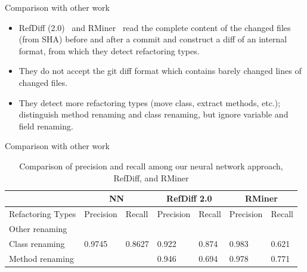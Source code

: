 \documentclass[xcolor=svgnames]{beamer}
\begin{document}
\begin{frame}{Comparison with other work}
\begin{itemize}
\item RefDiff (2.0)~\cite{silva2020refdiff} and RMiner~\cite{tsantalis2018accurate} read the complete content of the changed files (from SHA) before and after a commit and construct a diff of an internal format, from which they detect refactoring types.
\item They do not accept the git diff format which contains barely changed lines of changed files.
\item They detect more refactoring types (move class, extract methods, etc.); distinguish method renaming and class renaming, but ignore variable and field renaming.

\end{itemize}


\end{frame}

\begin{frame}{Comparison with other work}


\begin{table}[t]
\caption{Comparison of precision and recall among our neural network approach, RefDiff, and RMiner}
\label{nn-refdiff-rminer}
\renewcommand*{\arraystretch}{1.5}
\tiny
\begin{tabular}{|l|l|l|l|l|l|l|}
\hline
& \multicolumn{2}{c|}{NN}                              & \multicolumn{2}{c|}{RefDiff 2.0} & \multicolumn{2}{c|}{RMiner} \\ \hline
Refactoring Types & Precision                  & Recall                  & Precision        & Recall        & Precision      & Recall     \\ \hline
Other renaming    & \multirow{3}{*}{0.9745} & \multirow{3}{*}{0.8627} &                  &               &                &            \\ \cline{1-1} \cline{4-7}
Class renaming    &                            &                         & 0.922            & 0.874         & 0.983          & 0.621      \\ \cline{1-1} \cline{4-7}
Method renaming   &                            &                         & 0.946            & 0.694         & 0.978          & 0.771      \\ \hline
\end{tabular}
\end{table}
\end{frame}
\end{document}
